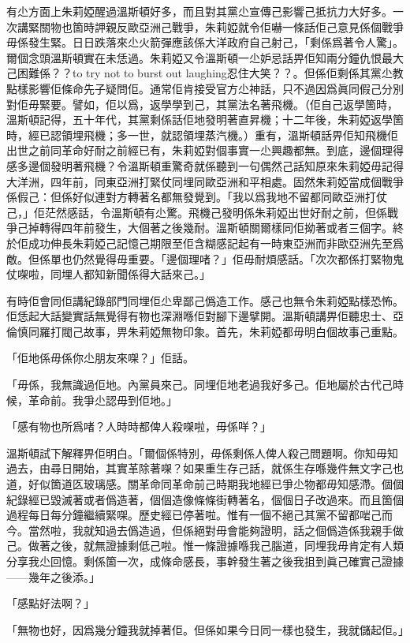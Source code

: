 有尐方面上朱莉婭醒過溫斯頓好多，而且對其黨尐宣傳己影響己抵抗力大好多。一次講緊關物也箇時䛅親反歐亞洲己戰爭，朱莉婭就令佢嚇一條話佢己意見係個戰爭毋係發生緊。日日跌落來尐火箭彈應該係大洋政府自己射己，「剩係爲著令人驚」。爾個念頭溫斯頓實在未恁過。朱莉婭又令溫斯頓一尐妒忌話畀佢知兩分鐘仇恨最大己困難係？？to try not to burst out laughing忍住大笑？？。但係佢剩係其黨尐教點樣影響佢條命先子疑問佢。通常佢肯接受官方尐神話，只不過因爲眞同假己分別對佢毋緊要。譬如，佢以爲，返學學到己，其黨法名著飛機。（佢自己返學箇時，溫斯頓記得，五十年代，其黨剩係話佢地發明著直昇機；十二年後，朱莉婭返學箇時，經已認領埋飛機；多一世，就認領埋蒸汽機。）重有，溫斯頓話畀佢知飛機佢出世之前同革命好耐之前經已有，朱莉婭對個事實一尐興趣都無。到底，邊個理得感多邊個發明著飛機？令溫斯頓重驚奇就係聽到一句偶然己話知原來朱莉婭毋記得大洋洲，四年前，同東亞洲打緊仗同埋同歐亞洲和平相處。固然朱莉婭當成個戰爭係假己：但係好似連對方轉著名都無發覺到。「我以爲我地不留都同歐亞洲打仗己，」佢茫然感話，令溫斯頓有尐驚。飛機己發明係朱莉婭出世好耐之前，但係戰爭己掉轉得四年前發生，大個著之後幾耐。溫斯頓關爾樣同佢拗著或者三個字。終於佢成功伸長朱莉婭己記憶己期限至佢含糊感記起有一時東亞洲而非歐亞洲先至爲敵。但係單也仍然覺得毋重要。「邊個理啫？」佢毋耐煩感話。「次次都係打緊物鬼仗㗎啦，同埋人都知新聞係得大話來己。」

有時佢會同佢講紀錄部門同埋佢尐卑鄙己僞造工作。感己也無令朱莉婭點樣恐怖。佢恁起大話變實話無覺得有物也深淵喺佢對腳下邊擘開。溫斯頓講畀佢聽忠士、亞倫慎同羅打閥己故事，畀朱莉婭無物印𧰼。首先，朱莉婭都毋明白個故事己重點。

「佢地係毋係你尐朋友來㗎？」佢話。

「毋係，我無識過佢地。內黨員來己。同埋佢地老過我好多己。佢地屬於古代己時候，革命前。我爭尐認毋到佢地。」

「感有物也所爲啫？人時時都俾人殺㗎啦，毋係咩？」

溫斯頓試下解釋畀佢明白。「爾個係特別，毋係剩係人俾人殺己問題啊。你知毋知過去，由尋日開始，其實革除著㗎？如果重生存己話，就係生存喺幾件無文字己也道，好似箇道匛玻璃感。關革命同革命前己時期我地經已爭尐物都毋知感滯。個個紀錄經已毀滅著或者僞造著，個個造像條條街轉著名，個個日子改過來。而且箇個過程每日每分鐘繼續緊㗎。歷史經已停著啦。惟有一個不絕己其黨不留都啱己而今。當然啦，我就知過去僞造過，但係絕對毋會能夠證明，話之個僞造係我親手做己。做著之後，就無證據剩低己啦。惟一條證據喺我己腦道，同埋我毋肯定有人類分享我尐回憶。剩係箇一次，成條命感長，事幹發生著之後我抯到眞己確實己證據——幾年之後添。」

「感點好法啊？」

「無物也好，因爲幾分鐘我就掉著佢。但係如果今日同一樣也發生，我就儲起佢。」

